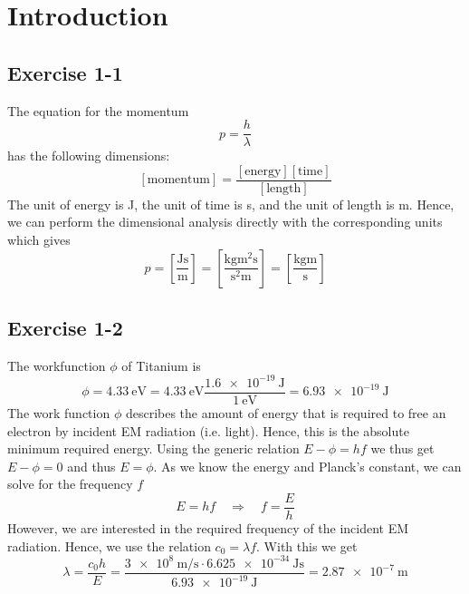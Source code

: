 \chapter{Introduction}

\section{Exercise 1-1}
The equation for the momentum
\begin{equation}
	p = \frac{h}{\lambda}
\end{equation}
has the following dimensions:
\[
	\left[\text{momentum}\right] = \frac{\left[\text{energy}\right] \left[\text{time}\right]}{\left[\text{length}\right]}
\]
The unit of energy is \si{\joule}, the unit of time is \si{\second}, and the
unit of length is \si{\meter}. Hence, we can perform the dimensional analysis
directly with the corresponding units which gives
\[
	p
	= \left[ \frac{\si{\joule} \si{\second}}{\si{\meter}} \right]
	= \left[ \frac{\si{\kilogram\meter\squared\second}}{\si{\second\squared\meter}} \right]
	= \left[ \frac{\si{\kilogram\meter}}{\si{\second}} \right]
\]

\section{Exercise 1-2}
The workfunction $\phi$ of Titanium is
\[
	\phi
	= \SI{4.33}{\eV}
	= \SI{4.33}{\eV} \frac{\SI{1.6e-19}{\joule}}{\SI{1}{\eV}}
	= \SI{6.93e-19}{\joule}
\]
The work function $\phi$ describes the amount of energy that is required to
free an electron by incident EM radiation (i.e. light). Hence, this is the
absolute minimum required energy. Using the generic relation
$E - \phi = h f$ we thus get $E - \phi = 0$ and thus $E = \phi$. As we know
the energy and Planck's constant, we can solve for the frequency $f$
\[
	E = h f \quad \Rightarrow \quad f = \frac{E}{h}
\]
However, we are interested in the required frequency of the incident EM
radiation. Hence, we use the relation $c_0 = \lambda f$. With this we get
\[
	\lambda
	= \frac{c_0 h}{E}
	= \frac{\SI{3e8}{\meter\per\second} \cdot \SI{6.625e-34}{\joule\second}}{\SI{6.93e-19}{\joule}}
	= \SI{2.87e-7}{\meter}
\]



